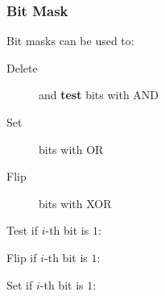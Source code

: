 

\subsubsection{Bit Mask}
Bit masks can be used to:
\begin{description}
    \item[Delete] and \textbf{test} bits with AND
    \item[Set] bits with OR
    \item[Flip] bits with XOR
\end{description}

Test if $i$-th bit is $1$: 

Flip if $i$-th bit is $1$: 

Set if $i$-th bit is $1$: 

